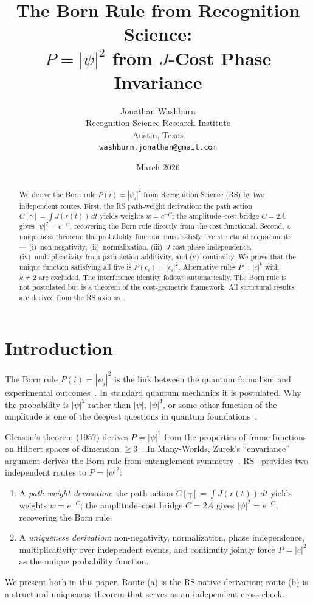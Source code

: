 \documentclass[12pt,a4paper]{article}
\title{The Born Rule from Recognition Science:\\
$P = |\psi|^2$ from $J$-Cost Phase Invariance}
\author{Jonathan Washburn\\
Recognition Science Research Institute\\
Austin, Texas\\
\texttt{washburn.jonathan@gmail.com}}
\date{March 2026}
\theoremstyle{definition}
\theoremstyle{remark}
\begin{document}
\maketitle

\begin{abstract}
We derive the Born rule $P(i) = |\psi_i|^2$ from Recognition
Science (RS) by two independent routes.  First, the RS path-weight
derivation: the path action $C[\gamma] = \int J(r(t))\,dt$ yields
weights $w = e^{-C}$; the amplitude--cost bridge $C = 2A$ gives
$|\psi|^2 = e^{-C}$, recovering the Born rule directly from the
cost functional.  Second, a uniqueness theorem: the probability
function must satisfy five structural requirements---%
(i)~non-negativity, (ii)~normalization, (iii)~$J$-cost phase
independence, (iv)~multiplicativity from path-action
additivity, and (v)~continuity.  We prove that the unique
function satisfying all five is $P(c_i) = |c_i|^2$.
Alternative rules $P = |c|^k$ with $k \neq 2$ are excluded.
The interference identity follows automatically.  The Born rule
is not postulated but is a theorem of the cost-geometric
framework.  All structural results are derived from the RS axioms~\cite{RS_Axioms}.
\end{abstract}

\section{Introduction}
\label{sec:intro}

The Born rule $P(i) = |\psi_i|^2$ is the link between the quantum
formalism and experimental outcomes~\cite{Born1926}.  In standard
quantum mechanics it is postulated.  Why the probability is
$|\psi|^2$ rather than $|\psi|$, $|\psi|^4$, or some other
function of the amplitude is one of the deepest questions in
quantum foundations~\cite{vN1932}.

Gleason's theorem (1957) derives $P = |\psi|^2$ from the
properties of frame functions on Hilbert spaces of dimension
$\geq 3$~\cite{Gleason1957}.  In Many-Worlds, Zurek's
``envariance'' argument derives the Born rule from entanglement
symmetry~\cite{Zurek2005}.  RS~\cite{RS_Axioms} provides two independent routes
to $P = |\psi|^2$:
\begin{enumerate}[label=(\alph*),nosep]
  \item A \emph{path-weight derivation}: the path action
  $C[\gamma] = \int J(r(t))\,dt$ yields weights
  $w = e^{-C}$; the amplitude--cost bridge $C = 2A$ gives
  $|\psi|^2 = e^{-C}$, recovering the Born rule.
  \item A \emph{uniqueness derivation}: non-negativity,
  normalization, phase independence, multiplicativity
  over independent events, and continuity jointly force
  $P = |c|^2$ as the unique probability function.
\end{enumerate}
We present both in this paper.  Route (a) is the RS-native
derivation; route (b) is a structural uniqueness theorem that
serves as an independent cross-check.
\end{document}

